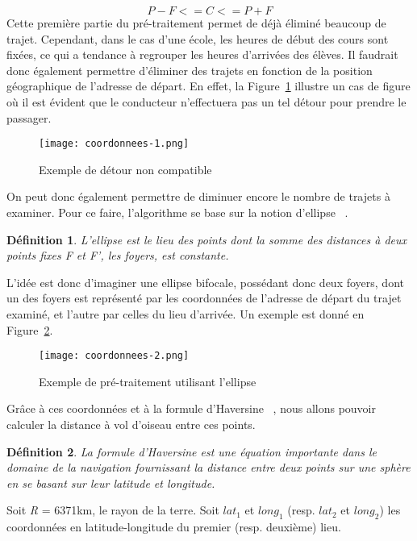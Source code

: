 \documentclass[12pt, a4paper, oneside]{article}
\newtheorem{defi}{D\'efinition}[section]
\begin{document}
    \begin{equation*}
        P-F <= C <= P+F
    \end{equation*}
    Cette première partie du pré-traitement permet de déjà éliminé beaucoup de trajet. Cependant, dans le cas d'une école, les heures de début des cours sont fixées, ce qui a tendance à regrouper les heures d'arrivées des élèves. Il faudrait donc également permettre d'éliminer des trajets en fonction de la position géographique de l'adresse de départ. En effet, la Figure~\ref{coordonnees-1} illustre un cas de figure où il est évident que le conducteur n'effectuera pas un tel détour pour prendre le passager. 
    \begin{figure}[!htb]
        \begin{center}
         \texttt{[image: coordonnees-1.png]}
         \caption{Exemple de détour non compatible}
         \label{coordonnees-1}
        \end{center}
       \end{figure}
       On peut donc également permettre de diminuer encore le nombre de trajets à examiner. Pour ce faire, l'algorithme se base sur la notion d'ellipse ~\cite{ellipse}.
    \begin{defi}
        L'ellipse est le lieu des points dont la somme des distances à deux points fixes F et F', les foyers, est constante.
    \end{defi}
     L'idée est donc d'imaginer une ellipse bifocale, possédant donc deux foyers, dont un des foyers est représenté par les coordonnées de l'adresse de départ du trajet examiné, et l'autre par celles du lieu d'arrivée. Un exemple est donné en Figure~\ref{coordonnees-2}.
     \begin{figure}[!htb]
      \begin{center}
       \texttt{[image: coordonnees-2.png]}
       \caption{Exemple de pré-traitement utilisant l'ellipse}
       \label{coordonnees-2}
      \end{center}
     \end{figure}
      Grâce à ces coordonnées et à la formule d'Haversine ~\cite{haversine}, nous allons pouvoir calculer la distance à vol d'oiseau entre ces points. 
     \begin{defi}
         La formule d'Haversine est une équation importante dans le domaine de la navigation fournissant la distance entre deux points sur une sphère en se basant sur leur latitude et longitude.
     \end{defi}
     \noindent Soit \textit{R} = 6371km, le rayon de la terre. Soit \textit{$lat_{1}$} et \textit{$long_{1}$} (resp. \textit{$lat_{2}$} et \textit{$long_{2}$}) les coordonnées en latitude-longitude du premier (resp. deuxième) lieu. \\
\end{document}
